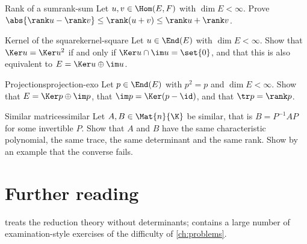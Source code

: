 \begin{exercise}{Rank of a sum}{rank-sum}
Let $u,v\in\Hom(E,F)$ with $\dim E<\infty$. Prove
$\abs{\rank u-\rank v}\leq\rank(u+v)\leq\rank u+\rank v$.
\end{exercise}

\begin{exercise}{Kernel of the square}{kernel-square}
Let $u\in\End(E)$ with $\dim E<\infty$. Show that
$\Ker u=\Ker u^{2}$ if and only if $\Ker u\cap\im u=\set{0}$, and that this is
also equivalent to $E=\Ker u\oplus\im u$.
\end{exercise}

\begin{exercise}{Projections}{projection-exo}
Let $p\in\End(E)$ with $p^{2}=p$ and $\dim E<\infty$. Show that
$E=\Ker p\oplus\im p$, that $\im p=\Ker(p-\id)$, and that $\tr p=\rank p$.
\end{exercise}

\begin{exercise}{Similar matrices}{similar}
Let $A,B\in\Mat{n}{\K}$ be similar, that is $B=P^{-1}AP$ for some invertible
$P$. Show that $A$ and $B$ have the same characteristic polynomial, the same
trace, the same determinant and the same rank. Show by an example that the
converse fails.
\end{exercise}

\section{Further reading}

\Textcite{axler2015} treats the reduction theory without determinants;
\textcite{gourdon2009} contains a large number of examination-style exercises of
the difficulty of \cref{ch:problems}.
